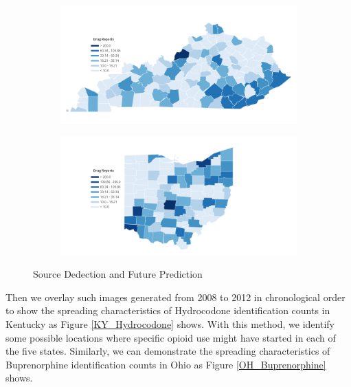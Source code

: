 \documentclass{mcmthesis}
\begin{document}
\begin{figure}[H]
    \centering
    \begin{subfigure}[b]{0.45\textwidth}
        \includegraphics[width=\textwidth]{../figure/KY_Hydrocodone_5}  
	\label{KY_Hydrocodone_5}  
    \end{subfigure}\hfill
    \begin{subfigure}[b]{0.45\textwidth}
        \includegraphics[width=\textwidth]{../figure/OH_Buprenorphine_1}  
	\label{OH}
    \end{subfigure}
    \caption{ Source Dedection and Future Prediction  }\label{fig:fancy}
\end{figure}



Then we overlay such images generated from 2008 to 2012 in chronological order to show the spreading characteristics of Hydrocodone identification counts in Kentucky as Figure \ref{KY_Hydrocodone} shows. With this method, we identify some  possible locations where specific opioid use might have started in each of the five states. Similarly, we can demonstrate the spreading characteristics of Buprenorphine identification counts in Ohio as Figure \ref{OH_Buprenorphine} shows.
\end{document}
